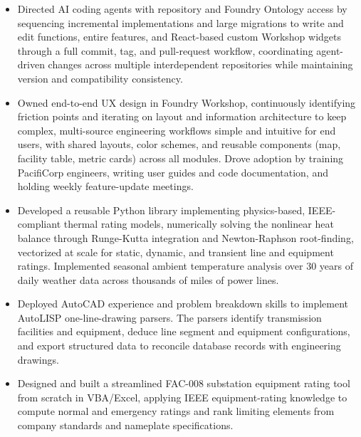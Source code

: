 \documentclass[10pt, letterpaper]{article}
\newenvironment{rlist}{%
  \begin{itemize}[leftmargin=1.4em, itemsep=1pt, topsep=2pt, parsep=0pt]%
}{%
  \end{itemize}%
}
\begin{document}
\begin{rlist}
  \item Directed AI coding agents with repository and Foundry Ontology access by sequencing incremental implementations and large migrations to write and edit functions, entire features, and React-based custom Workshop widgets through a full commit, tag, and pull-request workflow, coordinating agent-driven changes across multiple interdependent repositories while maintaining version and compatibility consistency.
  \item Owned end-to-end UX design in Foundry Workshop, continuously identifying friction points and iterating on layout and information architecture to keep complex, multi-source engineering workflows simple and intuitive for end users, with shared layouts, color schemes, and reusable components (map, facility table, metric cards) across all modules. Drove adoption by training PacifiCorp engineers, writing user guides and code documentation, and holding weekly feature-update meetings.
  \item Developed a reusable Python library implementing physics-based, IEEE-compliant thermal rating models, numerically solving the nonlinear heat balance through Runge-Kutta integration and Newton-Raphson root-finding, vectorized at scale for static, dynamic, and transient line and equipment ratings. Implemented seasonal ambient temperature analysis over 30 years of daily weather data across thousands of miles of power lines.
  \item Deployed AutoCAD experience and problem breakdown skills to implement AutoLISP one-line-drawing parsers. The parsers identify transmission facilities and equipment, deduce line segment and equipment configurations, and export structured data to reconcile database records with engineering drawings.
  \item Designed and built a streamlined FAC-008 substation equipment rating tool from scratch in VBA/Excel, applying IEEE equipment-rating knowledge to compute normal and emergency ratings and rank limiting elements from company standards and nameplate specifications.
\end{rlist}
\end{document}
